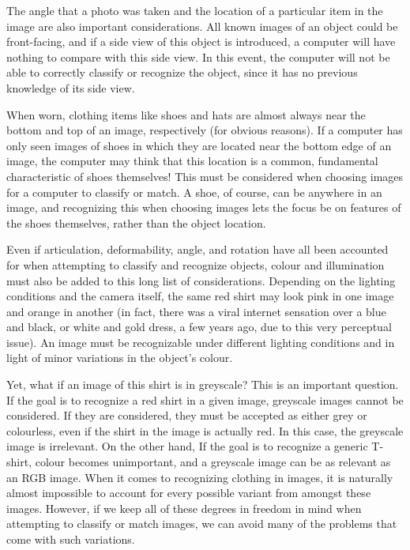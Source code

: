 \documentclass[12pt]{report} %
\begin{document}
	The angle that a photo was taken and the location of a particular item in the image are also important considerations. All known images of an object could be front-facing, and if a side view of this object is introduced, a computer will have nothing to compare with this side view. In this event, the computer will not be able to correctly classify or recognize the object, since it has no previous knowledge of its side view. 

	When worn, clothing items like shoes and hats are almost always near the bottom and top of an image, respectively (for obvious reasons). If a computer has only seen images of shoes in which they are located near the bottom edge of an image, the computer may think that this location is a common, fundamental characteristic of shoes themselves! This must be considered when choosing images for a computer to classify or match. A shoe, of course, can be anywhere in an image, and recognizing this when choosing images lets the focus be on features of the shoes themselves, rather than the object location. 
	
	Even if articulation, deformability, angle, and rotation have all been accounted for when attempting to classify and recognize objects, colour and illumination must also be added to this long list of considerations. Depending on the lighting conditions and the camera itself, the same red shirt may look pink in one image and orange in another (in fact, there was a viral internet sensation over a blue and black, or white and gold dress, a few years ago, due to this very perceptual issue). An image must be recognizable under different lighting conditions and in light of minor variations in the object's colour. 

	Yet, what if an image of this shirt is in greyscale? This is an important question. If the goal is to recognize a red shirt in a given image, greyscale images cannot be considered. If they are considered, they must be accepted as either grey or colourless, even if the shirt in the image is actually red. In this case, the greyscale image is irrelevant. On the other hand, If the goal is to recognize a generic T-shirt, colour becomes unimportant, and a greyscale image can be as relevant as an RGB image.
	When it comes to recognizing clothing in images, it is naturally almost impossible to account for every possible variant from amongst these images. However, if we keep all of these degrees in freedom in mind when attempting to classify or match images, we can avoid many of the problems that come with such variations. 
		
\end{document}
